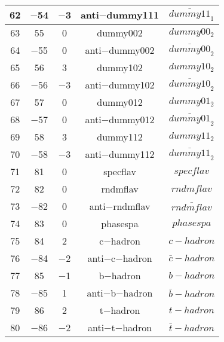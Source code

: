 \documentclass{article}
\begin{document}
\begin{table}[!htbp]
\begin{tabular}{|c|c|c|c|c|}
\hline
62 & $-$54 & $-$3 & anti$-$dummy11\underline{\hspace{0.6em}}1 & $\bar{dummy11}_{1}$ \\
\hline
63 & 55 & 0 & dummy00\underline{\hspace{0.6em}}2 & $dummy00_{2}$ \\
\hline
64 & $-$55 & 0 & anti$-$dummy00\underline{\hspace{0.6em}}2 & $\bar{dummy00}_{2}$ \\
\hline
65 & 56 & 3 & dummy10\underline{\hspace{0.6em}}2 & $dummy10_{2}$ \\
\hline
66 & $-$56 & $-$3 & anti$-$dummy10\underline{\hspace{0.6em}}2 & $\bar{dummy10}_{2}$ \\
\hline
67 & 57 & 0 & dummy01\underline{\hspace{0.6em}}2 & $dummy01_{2}$ \\
\hline
68 & $-$57 & 0 & anti$-$dummy01\underline{\hspace{0.6em}}2 & $\bar{dummy01}_{2}$ \\
\hline
69 & 58 & 3 & dummy11\underline{\hspace{0.6em}}2 & $dummy11_{2}$ \\
\hline
70 & $-$58 & $-$3 & anti$-$dummy11\underline{\hspace{0.6em}}2 & $\bar{dummy11}_{2}$ \\
\hline
71 & 81 & 0 & specflav & $specflav$ \\
\hline
72 & 82 & 0 & rndmflav & $rndmflav$ \\
\hline
73 & $-$82 & 0 & anti$-$rndmflav & $\bar{rndmflav}$ \\
\hline
74 & 83 & 0 & phasespa & $phasespa$ \\
\hline
75 & 84 & 2 & c$-$hadron & $c-hadron$ \\
\hline
76 & $-$84 & $-$2 & anti$-$c$-$hadron & $\bar{c}-hadron$ \\
\hline
77 & 85 & $-$1 & b$-$hadron & $b-hadron$ \\
\hline
78 & $-$85 & 1 & anti$-$b$-$hadron & $\bar{b}-hadron$ \\
\hline
79 & 86 & 2 & t$-$hadron & $t-hadron$ \\
\hline
80 & $-$86 & $-$2 & anti$-$t$-$hadron & $\bar{t}-hadron$ \\
\hline
\end{tabular}
\end{table}

\clearpage
\end{document}
